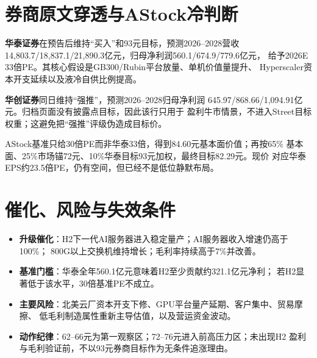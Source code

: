 \section{券商原文穿透与AStock冷判断}

\textbf{华泰证券}在预告后维持“买入”和93元目标，预测2026--2028营收
14,803.7/18,837.1/21,890.3亿元，归母净利润560.1/674.9/779.6亿元，
给予2026E 33倍PE。其核心假设是GB300/Rubin平台放量、单机价值量提升、
Hyperscaler资本开支延续以及液冷自供比例提高。

\textbf{华创证券}同日维持“强推”，预测2026--2028归母净利润
645.97/868.66/1,094.91亿元。归档页面没有披露点目标，因此该行只用于
盈利牛市情景，不进入Street目标权重；这避免把“强推”评级伪造成目标价。

AStock基准只给30倍PE而非华泰33倍，得到84.60元基本面价值；再按65\%
基本面、25\%市场锚72元、10\%华泰目标93元加权，最终目标82.29元。现价
对应华泰EPS约23.5倍PE，仍有空间，但已经不是低位静默布局。

\section{催化、风险与失效条件}

\begin{itemize}
  \item \textbf{升级催化}：H2下一代AI服务器进入稳定量产；AI服务器收入增速仍高于100\%；
  800G以上交换机维持增长；毛利率持续高于7\%并改善。
  \item \textbf{基准门槛}：华泰全年560.1亿元意味着H2至少贡献约321.1亿元净利；
  若H2显著低于该水平，30倍基准PE不成立。
  \item \textbf{主要风险}：北美云厂资本开支下修、GPU平台量产延期、客户集中、贸易摩擦、
  低毛利制造属性重新主导估值，以及营运资金波动。
  \item \textbf{动作纪律}：62--66元为第一观察区；72--76元进入前高压力区；未出现H2
  盈利与毛利验证前，不以93元券商目标作为无条件追涨理由。
\end{itemize}
